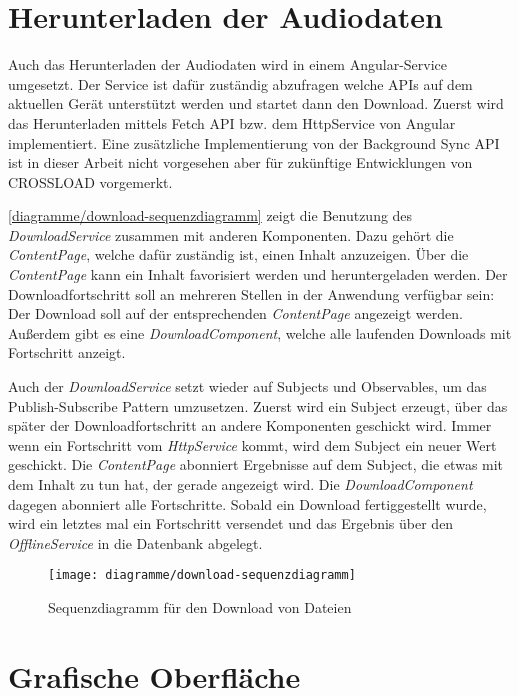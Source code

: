 \section{Herunterladen der Audiodaten}
Auch das Herunterladen der Audiodaten wird in einem Angular-Service umgesetzt. Der Service ist dafür zuständig abzufragen welche APIs auf dem aktuellen Gerät unterstützt werden und startet dann den Download. Zuerst wird das Herunterladen mittels Fetch \ac{API} bzw. dem HttpService von Angular implementiert. Eine zusätzliche Implementierung von der Background Sync \ac{API} ist in dieser Arbeit nicht vorgesehen aber für zukünftige Entwicklungen von CROSSLOAD vorgemerkt. 

\autoref{diagramme/download-sequenzdiagramm} zeigt die Benutzung des \textit{DownloadService} zusammen mit anderen Komponenten. Dazu gehört die \textit{ContentPage}, welche dafür zuständig ist, einen Inhalt anzuzeigen. Über die \textit{ContentPage} kann ein Inhalt favorisiert werden und heruntergeladen werden. Der Downloadfortschritt soll an mehreren Stellen in der Anwendung verfügbar sein: Der Download soll auf der entsprechenden \textit{ContentPage} angezeigt werden. Außerdem gibt es eine \textit{DownloadComponent}, welche alle laufenden Downloads mit Fortschritt anzeigt. 

Auch der \textit{DownloadService} setzt wieder auf Subjects und Observables, um das Publish-Subscribe Pattern umzusetzen. Zuerst wird ein Subject erzeugt, über das später der Downloadfortschritt an andere Komponenten geschickt wird. Immer wenn ein Fortschritt vom \textit{HttpService} kommt, wird dem Subject ein neuer Wert geschickt. Die \textit{ContentPage} abonniert Ergebnisse auf dem Subject, die etwas mit dem Inhalt zu tun hat, der gerade angezeigt wird. Die \textit{DownloadComponent} dagegen abonniert alle Fortschritte. Sobald ein Download fertiggestellt wurde, wird ein letztes mal ein Fortschritt versendet und das Ergebnis über den \textit{OfflineService} in die Datenbank abgelegt.

\begin{sidewaysfigure}
 \texttt{[image: diagramme/download-sequenzdiagramm]}
  \caption{Sequenzdiagramm für den Download von Dateien}
  \label{diagramme/download-sequenzdiagramm}
\end{sidewaysfigure}

\section{Grafische Oberfläche}
